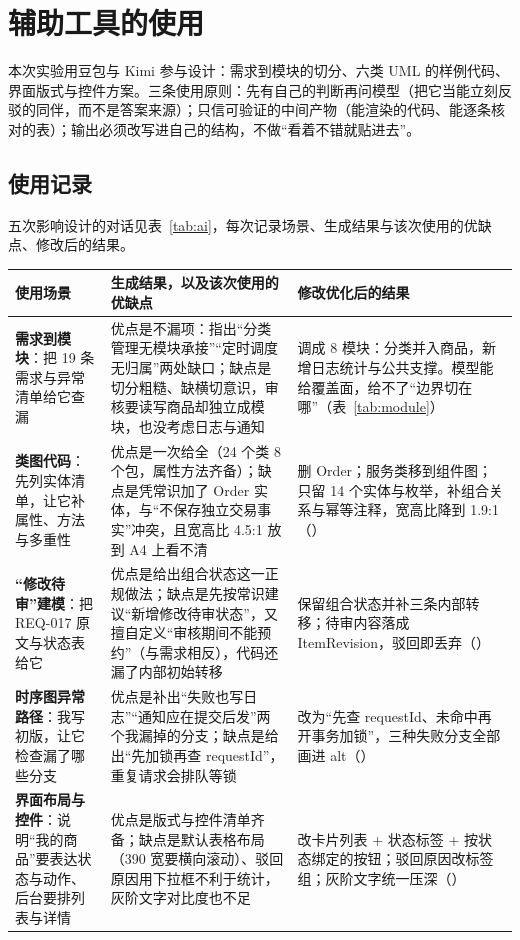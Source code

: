 \clearpage
\section{辅助工具的使用}

本次实验用豆包与 Kimi 参与设计：需求到模块的切分、六类 UML 的样例代码、界面版式与控件方案。三条使用原则：先有自己的判断再问模型（把它当能立刻反驳的同伴，而不是答案来源）；只信可验证的中间产物（能渲染的代码、能逐条核对的表）；输出必须改写进自己的结构，不做“看着不错就贴进去”。

\subsection{使用记录}

五次影响设计的对话见表~\ref{tab:ai}，每次记录场景、生成结果与该次使用的优缺点、修改后的结果。

\begin{center}
\label{tab:ai}
\renewcommand{\arraystretch}{1.15}
\begin{tabularx}{\textwidth}{@{}p{2.95cm}Yp{5.15cm}@{}}
\toprule
使用场景 & 生成结果，以及该次使用的优缺点 & 修改优化后的结果 \\
\midrule
\textbf{需求到模块}：把 19 条需求与异常清单给它查漏 & 优点是不漏项：指出“分类管理无模块承接”“定时调度无归属”两处缺口；缺点是切分粗糙、缺横切意识，审核要读写商品却独立成模块，也没考虑日志与通知 & 调成 8 模块：分类并入商品，新增日志统计与公共支撑。模型能给覆盖面，给不了“边界切在哪”（表~\ref{tab:module}） \\
\textbf{类图代码}：先列实体清单，让它补属性、方法与多重性 & 优点是一次给全（24 个类 8 个包，属性方法齐备）；缺点是凭常识加了 Order 实体，与“不保存独立交易事实”冲突，且宽高比 4.5:1 放到 A4 上看不清 & 删 Order；服务类移到组件图；只留 14 个实体与枚举，补组合关系与幂等注释，宽高比降到 1.9:1（） \\
\textbf{“修改待审”建模}：把 REQ-017 原文与状态表给它 & 优点是给出组合状态这一正规做法；缺点是先按常识建议“新增修改待审状态”，又擅自定义“审核期间不能预约”（与需求相反），代码还漏了内部初始转移 & 保留组合状态并补三条内部转移；待审内容落成 ItemRevision，驳回即丢弃（） \\
\textbf{时序图异常路径}：我写初版，让它检查漏了哪些分支 & 优点是补出“失败也写日志”“通知应在提交后发”两个我漏掉的分支；缺点是给出“先加锁再查 requestId”，重复请求会排队等锁 & 改为“先查 requestId、未命中再开事务加锁”，三种失败分支全部画进 alt（） \\
\textbf{界面布局与控件}：说明“我的商品”要表达状态与动作、后台要排列表与详情 & 优点是版式与控件清单齐备；缺点是默认表格布局（390 宽要横向滚动）、驳回原因用下拉框不利于统计，灰阶文字对比度也不足 & 改卡片列表 + 状态标签 + 按状态绑定的按钮；驳回原因改标签组；灰阶文字统一压深（） \\
\bottomrule
\end{tabularx}
\end{center}

